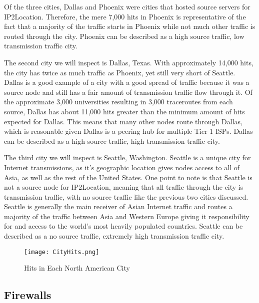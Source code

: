 \documentclass{sigcomm-alternate}
\begin{document}
Of the three cities, Dallas and Phoenix were cities that hosted source servers for IP2Location. Therefore, the mere 7,000 hits in Phoenix is representative of the fact that a majority of the traffic starts in Phoenix while not much other traffic is routed through the city. Phoenix can be described as a high source traffic, low transmission traffic city. 

The second city we will inspect is Dallas, Texas. With approximately 14,000 hits, the city has twice as much traffic as Phoenix, yet still very short of Seattle. Dallas is a good example of a city with a good spread of traffic because it was a source node and still has a fair amount of transmission traffic flow through it. Of the approximate 3,000 universities resulting in 3,000 traceroutes from each source, Dallas has about 11,000 hits greater than the minimum amount of hits expected for Dallas. This means that many other nodes route through Dallas, which is reasonable given Dallas is a peering hub for multiple Tier 1 ISPs. Dallas can be described as a high source traffic, high transmission traffic city. 

The third city we will inspect is Seattle, Washington. Seattle is a unique city for Internet transmissions, as it’s geographic location gives nodes access to all of Asia, as well as the rest of the United States. One point to note is that Seattle is not a source node for IP2Location, meaning that all traffic through the city is transmission traffic, with no source traffic like the previous two cities discussed. Seattle is generally the main receiver of Asian Internet traffic and routes a majority of the traffic between Asia and Western Europe giving it responsibility for and access to the world’s most heavily populated countries. Seattle can be described as a no source traffic, extremely high transmission traffic city.
\begin{figure}[h!]
  \caption{Hits in Each North American City}
  \centering
    \texttt{[image: CityHits.png]}
\end{figure}
\subsection{Firewalls}
\end{document}
